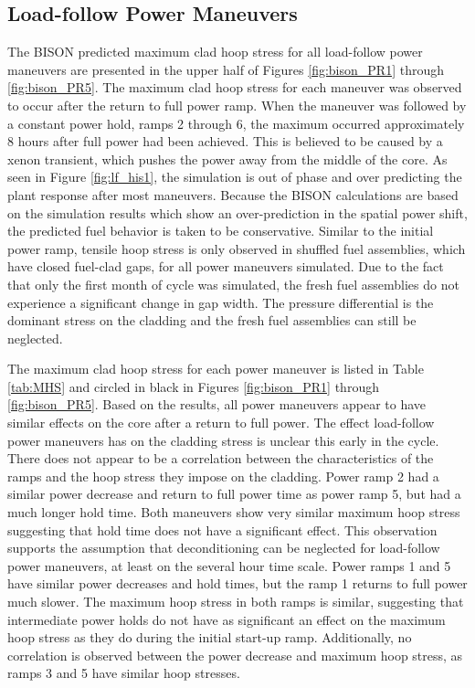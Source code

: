 \documentclass[edeposit,fullpage,11pt]{uiucthesis2009}
\begin{document}
\subsection{Load-follow Power Maneuvers}

The BISON predicted maximum clad hoop stress for all load-follow power maneuvers are presented in the upper half of Figures \ref{fig:bison_PR1} through \ref{fig:bison_PR5}.
The maximum clad hoop stress  for each maneuver was observed to occur after the return to full power ramp.
When the maneuver was followed by a constant power hold, ramps 2 through 6, the maximum occurred approximately 8 hours after full power had been achieved.
This is believed to be caused by a xenon transient, which pushes the power away from the middle of the core.
As seen in Figure \ref{fig:lf_his1}, the simulation is out of phase and over predicting the plant response after most maneuvers.
Because the BISON calculations are based on the simulation results which show an over-prediction in the spatial power shift, the predicted fuel behavior is taken to be conservative.
Similar to the initial power ramp, tensile hoop stress is only observed in shuffled fuel assemblies, which have closed fuel-clad gaps, for all power maneuvers simulated.
Due to the fact that only the first month of cycle was simulated, the fresh fuel assemblies do not experience a significant change in gap width.
The pressure differential is the dominant stress on the cladding and the fresh fuel assemblies can still be neglected.

The maximum clad hoop stress for each power maneuver is listed in Table \ref{tab:MHS} and circled in black in Figures \ref{fig:bison_PR1} through \ref{fig:bison_PR5}. 
Based on the results, all power maneuvers appear to have similar effects on the core after a return to full power.
The effect load-follow power maneuvers has on the cladding stress is unclear this early in the cycle.
There does not appear to be a correlation between the characteristics of the ramps and the hoop stress they impose on the cladding.
Power ramp 2 had a similar power decrease and return to full power time as power ramp 5, but had a much longer hold time.
Both maneuvers show very similar maximum hoop stress suggesting that hold time does not have a significant  effect.
This observation supports the assumption that deconditioning can be neglected for load-follow power maneuvers, at least on the several hour time scale.
Power ramps 1 and 5 have similar power decreases and hold times, but the ramp 1 returns to full power much slower.
The maximum hoop stress in both ramps is similar, suggesting that intermediate power holds do not have as significant an effect on the maximum hoop stress as they do during the initial start-up ramp.
Additionally, no correlation is observed between the power decrease and maximum hoop stress, as ramps 3 and 5 have similar hoop stresses.
\end{document}
